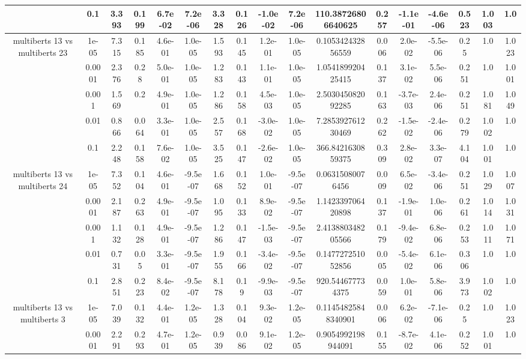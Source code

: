 \begin{tabular}{|c|c|c|c|c|c|c|c|c|c|c|c|c|c|c|c|c|}
 & 0.1 & 3.393 & 0.199 & 6.7e-02 & 7.2e-06 & 3.328 & 0.126 & -1.0e-02 & 7.2e-06 & 110.38726806640625 & 0.257 & -1.1e-01 & -4.6e-06 & 0.523 & 1.003 & 1.0 \\
\hline
\multirow{5}{*}{multiberts 13 vs multiberts 23} & 1e-05 & 7.315 & 0.185 & 4.6e-01 & 1.0e-05 & 1.593 & 0.145 & 1.2e-01 & 1.0e-05 & 0.105342432856559 & 0.006 & 2.0e-02 & -5.5e-06 & 0.25 & 1.0 & 1.023 \\
 & 0.0001 & 2.376 & 0.28 & 5.0e-01 & 1.0e-05 & 1.283 & 0.143 & 1.1e-01 & 1.0e-05 & 1.054189920425415 & 0.137 & 3.1e-02 & 5.5e-06 & 0.251 & 1.0 & 1.001 \\
 & 0.001 & 1.569 & 0.2 & 4.9e-01 & 1.0e-05 & 1.286 & 0.158 & 4.5e-03 & 1.0e-05 & 2.503045082092285 & 0.163 & -3.7e-03 & 2.4e-06 & 0.251 & 1.081 & 1.049 \\
 & 0.01 & 0.866 & 0.064 & 3.3e-01 & 1.0e-05 & 2.557 & 0.168 & -3.0e-02 & 1.0e-05 & 7.285392761230469 & 0.262 & -1.5e-02 & -2.4e-06 & 0.279 & 1.002 & 1.0 \\
 & 0.1 & 2.248 & 0.158 & 7.6e-02 & 1.0e-05 & 3.525 & 0.147 & -2.6e-02 & 1.0e-05 & 366.8421630859375 & 0.309 & 2.8e-02 & 3.3e-07 & 4.104 & 1.001 & 1.0 \\
\hline
\multirow{5}{*}{multiberts 13 vs multiberts 24} & 1e-05 & 7.352 & 0.104 & 4.6e-01 & -9.5e-07 & 1.668 & 0.152 & 1.0e-01 & -9.5e-07 & 0.06315080076456 & 0.009 & 6.5e-02 & -3.4e-06 & 0.251 & 1.029 & 1.007 \\
 & 0.0001 & 2.187 & 0.263 & 4.9e-01 & -9.5e-07 & 1.095 & 0.133 & 8.9e-02 & -9.5e-07 & 1.142339706420898 & 0.137 & -1.9e-01 & 1.0e-06 & 0.261 & 1.014 & 1.031 \\
 & 0.001 & 1.132 & 0.128 & 4.9e-01 & -9.5e-07 & 1.286 & 0.147 & -1.5e-03 & -9.5e-07 & 2.413880348205566 & 0.179 & -9.4e-02 & 6.8e-06 & 0.253 & 1.011 & 1.071 \\
 & 0.01 & 0.731 & 0.05 & 3.3e-01 & -9.5e-07 & 1.955 & 0.166 & -3.4e-02 & -9.5e-07 & 0.147727251052856 & 0.005 & -5.4e-02 & 6.1e-06 & 0.306 & 1.0 & 1.0 \\
 & 0.1 & 2.851 & 0.223 & 8.4e-02 & -9.5e-07 & 8.178 & 0.19 & -9.9e-03 & -9.5e-07 & 920.544677734375 & 0.059 & 1.0e-01 & 5.8e-06 & 3.973 & 1.002 & 1.0 \\
\hline
\multirow{5}{*}{multiberts 13 vs multiberts 3} & 1e-05 & 7.039 & 0.132 & 4.4e-01 & 1.2e-05 & 1.328 & 0.104 & 9.3e-02 & 1.2e-05 & 0.11454825848340901 & 0.006 & 6.2e-02 & -7.1e-06 & 0.25 & 1.0 & 1.023 \\
 & 0.0001 & 2.291 & 0.293 & 4.7e-01 & 1.2e-05 & 0.939 & 0.086 & 9.1e-02 & 1.2e-05 & 0.9054992198944091 & 0.155 & -8.7e-02 & 4.1e-06 & 0.252 & 1.001 & 1.0 \\

\end{tabular}
